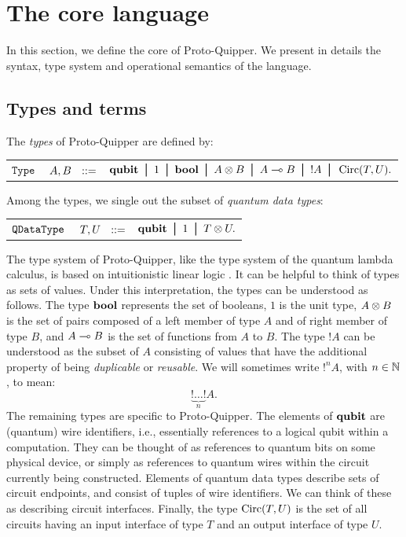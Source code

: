 \documentclass[twoside]{article}
\begin{document}
\clearpage
\section{The core language}\label{sec-core}

In this section, we define the core of Proto-Quipper. We 
present in details the syntax, type system and 
operational semantics of the language.

\subsection{Types and terms}
\label{ssec-types-and-terms}

\begin{definition} 
The \emph{types} of Proto-Quipper are defined by:
\begin{center}
\begin{tabular}{rrl}
$\texttt{Type}$&$~A,B~~::=$ & $ \qubit \bor 1 \bor \bool \bor A\tensor B \bor 
A\loli B \bor {!}A \bor \Circ (T,U).$\\
\end{tabular}
\end{center}
Among the types, we single out the subset of \emph{quantum data types}:
\begin{center}
\begin{tabular}{rrl}
$\texttt{QDataType}$&$~T,U~~::=$ & $\qubit \bor 1 \bor T \tensor U.$
\end{tabular}
\end{center}
\end{definition}

The type system of Proto-Quipper, like the type system of the quantum
lambda calculus, is based on intuitionistic linear logic
{\cite{Gir87}}.  It can be helpful to think of types as sets of
values. Under this interpretation, the types can be understood as
follows. The type $\textrm{\bf bool}$ represents the set of booleans, $1$ is the
unit type, $A\otimes B$ is the set of pairs composed of a left member of
type $A$ and of right member of type $B$, and $A\multimap B$ is the set of
functions from $A$ to $B$. The type ${!}A$ can be understood as the
subset of $A$ consisting of values that have the additional property
of being \emph{duplicable} or \emph{reusable}. We will sometimes write
${!}^nA$, with $n\in\mathbb{N}$, to mean:
\[
\underbrace{{!}\ldots {!}}_{n} A.
\]
The remaining types are specific to Proto-Quipper. The elements of
$\textrm{\bf qubit}$ are (quantum) wire identifiers, i.e., essentially references
to a logical qubit within a computation. They can be thought of as
references to quantum bits on some physical device, or simply as
references to quantum wires within the circuit currently being
constructed. Elements of quantum data types describe sets of circuit
endpoints, and consist of tuples of wire identifiers. We can think of
these as describing circuit interfaces. Finally, the type $\mathop{\textrm{Circ}}\nolimits(T,U)$
is the set of all circuits having an input interface of type $T$ and 
an output interface of type $U$. 
\end{document}
